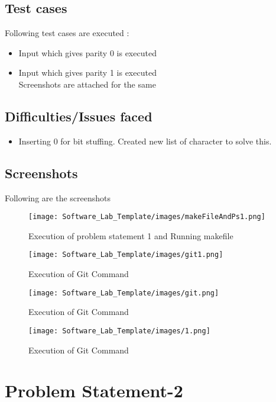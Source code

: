\documentclass[11pt,oneside]{book}
\begin{document}
\section{Test cases}
Following test cases are executed :
\begin{itemize}
    \item Input which gives parity 0 is executed
    \item Input which gives parity 1 is executed\\
Screenshots are attached for the same
\end{itemize}

\section{Difficulties/Issues faced}
\begin{itemize}
    \item Inserting 0 for bit stuffing. Created new list of character to solve this.
\end{itemize}

\section{Screenshots}
Following are the screenshots
\begin{figure}[h]
    \texttt{[image: Software\_Lab\_Template/images/makeFileAndPs1.png]}
  \caption{Execution of problem statement 1 and Running makefile}
  \label{fig:Problem statement 1 and Makefile}
\end{figure}
\begin{figure}[h]
    \texttt{[image: Software\_Lab\_Template/images/git1.png]}
  \caption{Execution of Git Command}
  \label{fig:Execution of Git Command}
\end{figure}
\begin{figure}[h]
    \texttt{[image: Software\_Lab\_Template/images/git.png]}
  \caption{Execution of Git Command}
  \label{fig:Execution of Git Command}
\end{figure}
\begin{figure}[h]
    \texttt{[image: Software\_Lab\_Template/images/1.png]}
  \caption{Execution of Git Command}
  \label{fig:Execution of Git Command}
\end{figure}

\chapter{\textbf{Problem Statement-2}}
\end{document}
